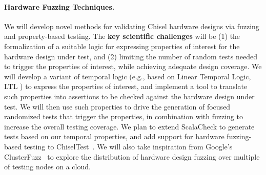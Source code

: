 \documentclass[fleqn,12pt]{article}
\newcommand{\todo}[1]{{\color{red} TODO: #1}}
\begin{document}
%
%
%
%

\paragraph{Hardware Fuzzing Techniques.}

%
We will develop novel methods for validating Chisel hardware designs via fuzzing
and property-based testing. The \textbf{key scientific challenges} will be
(1) the formalization of a suitable logic for expressing properties of
interest for the hardware design under test, and (2) limiting the number
of random tests needed to trigger the properties of interest, while achieving
adequate design coverage. We will develop a variant of temporal logic
\cite{Baier2008} (e.g., based on Linear Temporal Logic, LTL \cite{Pnueli1977LTL}) to
express the properties of interest, and implement a tool to translate such
properties into assertions to be checked against the hardware design under test.
We will then use such properties to drive the generation of focused randomized
tests that trigger the properties, in combination with fuzzing to increase the
overall testing coverage. We plan to extend ScalaCheck to generate
tests based on our temporal properties, and add support for hardware
fuzzing-based testing to ChiselTest~\cite{chisel:tester2}. We will also take
inspiration from Google's ClusterFuzz~\cite{web:clusterfuzz} to explore the
distribution of hardware design fuzzing over multiple of testing nodes on a
cloud.
\end{document}
